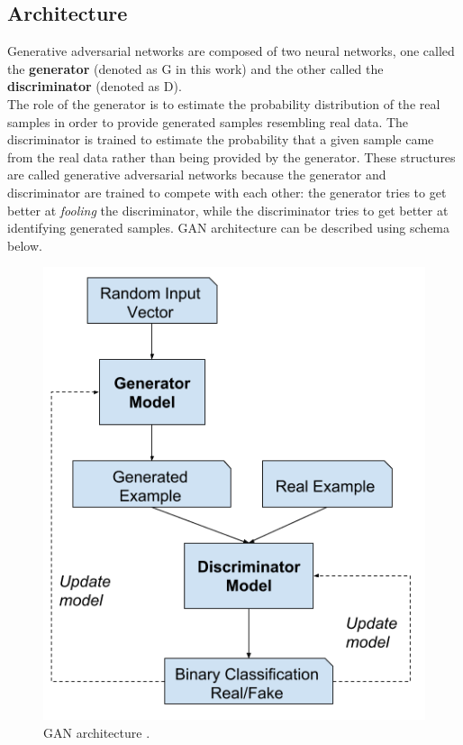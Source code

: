 \documentclass[12pt,a4paper,openany]{book}
\begin{document}
\subsection{Architecture}
\noindent Generative adversarial networks are composed of two neural networks, one called the \textbf{generator} (denoted as G in this work) and the other called the \textbf{discriminator} (denoted as D). \\
\noindent The role of the generator is to estimate the probability distribution of the real samples in order to provide generated samples resembling real data. The discriminator is trained to estimate the probability that a given sample came from the real data rather than being provided by the generator.
\noindent These structures are called generative adversarial networks because the generator and discriminator are trained to compete with each other: the generator tries to get better at \textit{fooling} the discriminator, while the discriminator tries to get better at identifying generated samples.  GAN architecture can be described using schema below.
 \begin{figure}[H]
     \centering
     \includegraphics[scale=0.3]{figs/gan_architecture.png}
     \caption{GAN architecture \cite{gan_arch}.}
 \end{figure}
\end{document}
